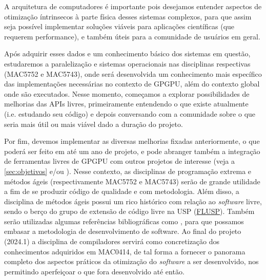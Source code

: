 \documentclass[10pt, a4paper, conference, onecolumn]{IEEEtran}
\begin{document}
A arquitetura de computadores é importante pois desejamos entender aspectos de
otimização íntrinsecos à parte física desses sistemas complexos, para que assim
seja possível implementar soluções viáveis para aplicações científicas (que
requerem performance), e também úteis para a comunidade de usuários em geral.

Após adquirir esses dados e um conhecimento básico dos sistemas em questão,
estudaremos a paralelização e sistemas operacionais nas disciplinas respectivas
(MAC5752 e MAC5743), onde será desenvolvida um conhecimento mais específico das
implementações necessárias no contexto de GPGPU, além do contexto global onde
são executados.
Nesse momento, começamos a explorar possibilidades de melhorias das APIs livres,
primeiramente entendendo o que existe atualmente (i.e. estudando seu código) e
depois conversando com a comunidade sobre o que seria mais útil ou mais viável
dado a duração do projeto.

Por fim, devemos implementar as diversas melhorias fixadas anteriormente, o que
poderá ser feito em até um ano de projeto, e pode abranger também a integração
de ferramentas livres de GPGPU com outros projetos de interesse (veja a
\cref{sec:objetivos}  e/ou \cite{zhang2019m, zhang2021demikernel}).
Nesse contexto, as disciplinas de programação extrema e métodos ágeis
(respectivamente MAC5752 e MAC5743) serão de grande utilidade a fim de se
produzir código de qualidade e com metodologia.
Além disso, a disciplina de métodos ágeis possui um rico histórico com relação
ao \textit{software} livre, sendo o berço do grupo de extensão de código livre
na USP (\href{https://flusp.ime.usp.br/}{FLUSP}).
Também serão utilizadas algumas referências bibliográficas como
\cite{aniche2022effective, narayan2008structure, fowler2018refactoring,
arpaci2018operating, ritchie1978c, stroustrup2013c++}, para que possamos
embasar a metodologia de desenvolvimento de software.
Ao final do projeto (2024.1) a disciplina de compiladores servirá como
concretização dos conhecimentos adquiridos em MAC0414, de tal forma a
fornecer o panorama completo dos aspectos práticos da otimização do
\textit{software} a ser desenvolvido, nos permitindo aperfeiçoar o que fora
desenvolvido até então.



\end{document}
